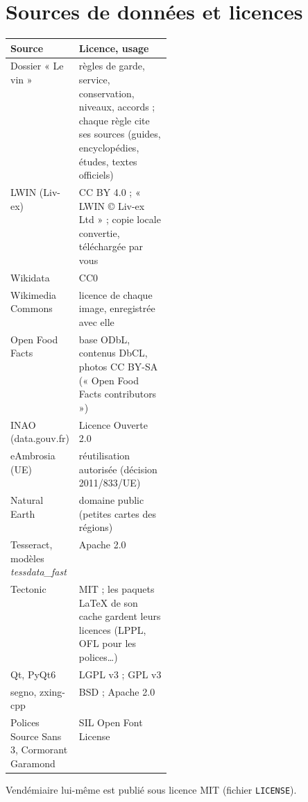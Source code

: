 \documentclass[11pt,a4paper]{article}
\begin{document}
\section{Sources de données et licences}
\begin{center}
\small
\begin{tabularx}{\linewidth}{>{\raggedright\arraybackslash}p{0.27\linewidth} X}
\toprule
\textbf{Source} & \textbf{Licence, usage} \\
\midrule
Dossier « Le vin » & règles de garde, service, conservation, niveaux, accords ; chaque règle cite ses sources
(guides, encyclopédies, études, textes officiels) \\
LWIN (Liv-ex) & CC BY 4.0 ; « LWIN © Liv-ex Ltd » ; copie locale convertie, téléchargée par vous \\
Wikidata & CC0 \\
Wikimedia Commons & licence de chaque image, enregistrée avec elle \\
Open Food Facts & base ODbL, contenus DbCL, photos CC BY-SA (« Open Food Facts contributors ») \\
INAO (data.gouv.fr) & Licence Ouverte 2.0 \\
eAmbrosia (UE) & réutilisation autorisée (décision 2011/833/UE) \\
Natural Earth & domaine public (petites cartes des régions) \\
Tesseract, modèles \emph{tessdata\_fast} & Apache 2.0 \\
Tectonic & MIT ; les paquets LaTeX de son cache gardent leurs licences (LPPL, OFL pour les polices…) \\
Qt, PyQt6 & LGPL v3 ; GPL v3 \\
segno, zxing-cpp & BSD ; Apache 2.0 \\
Polices Source Sans 3, Cormorant Garamond & SIL Open Font License \\
\bottomrule
\end{tabularx}
\end{center}
Vendémiaire lui-même est publié sous licence MIT (fichier \texttt{LICENSE}).

\end{document}
